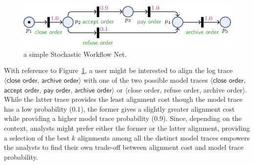 \begin{figure}[!t]
	\centering
	\includegraphics[width=.49\textwidth]{images/petri_tut.pdf}
	\caption{a simple Stochastic Workflow Net.}\label{fig:petri_tut}
\end{figure}
With reference to Figure~\ref{fig:petri_tut}, a user might be interested to align the log trace $\langle \textsf{close order},\,\textsf{archive order}\rangle$ with one of the two possible model traces $\langle\textsf{close order},$ $\textsf{accept order},\,\textsf{pay order},\,\textsf{archive order}\rangle$ or $\langle$\textsf{close order}, \textsf{refuse order}, \textsf{archive order}$\rangle$. While the latter trace provides the least alignment cost though the model trace has a low probability ($0.1$), the former gives a slightly greater alignment cost while providing a higher model trace probability ($0.9$). Since, depending on the context, analysts might prefer either the former or the latter alignment, providing a selection of the best $k$ alignments among all the distinct model traces empowers the analysts to find their own trade-off between alignment cost and model trace probability.



